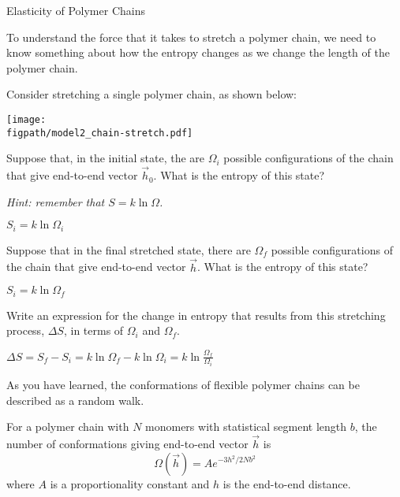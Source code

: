 \begin{activity}{Elasticity of Polymer Chains}
\begin{model}
\label{\labelbase:mdl:chainstretch}
	To understand the force that it takes to stretch a polymer chain, we need to know something about how the entropy changes as we change the length of the polymer chain.
	
	Consider stretching a single polymer chain, as shown below:
	
	\vspace{6pt}
	\centerline{\texttt{[image: \\figpath/model2\_chain-stretch.pdf]}}
\end{model}

\begin{ctqs}
	\question Suppose that, in the initial state, the are $\Omega_i$ possible configurations of the chain that give end-to-end vector $\vec h_0$.  What is the entropy of this state?
	
		\emph{Hint: remember that $S = k\ln\Omega$.}
		
		\begin{solution}[0.25in]
			$S_i = k\ln\Omega_i$
		\end{solution}
	
	\question Suppose that in the final stretched state, there are $\Omega_f$ possible configurations of the chain that give end-to-end vector $\vec h$.  What is the entropy of this state?
		
		\begin{solution}[0.25in]
			$S_i = k\ln\Omega_f$
		\end{solution}
	
	\question Write an expression for the change in entropy that results from this stretching process, $\Delta S$, in terms of $\Omega_i$ and $\Omega_f$. \label{\labelbase:ctq:delS}
		
		\begin{solution}[0.75in]
			$\Delta S = S_f - S_i = k\ln\Omega_f - k\ln\Omega_i = k\ln\frac{\Omega_f}{\Omega_i}$
		\end{solution}
	
\end{ctqs}

\begin{infobox}

	As you have learned, the conformations of flexible polymer chains can be described as a random walk.
	
	For a polymer chain with $N$ monomers with statistical segment length $b$, the number of conformations giving end-to-end vector $\vec h$ is
	\begin{equation*}
		\Omega(\vec h) = A e^{-3h^2/2Nb^2}
	\end{equation*}
	where $A$ is a proportionality constant and $h$ is the end-to-end distance.
	

\end{infobox}
\end{activity}

